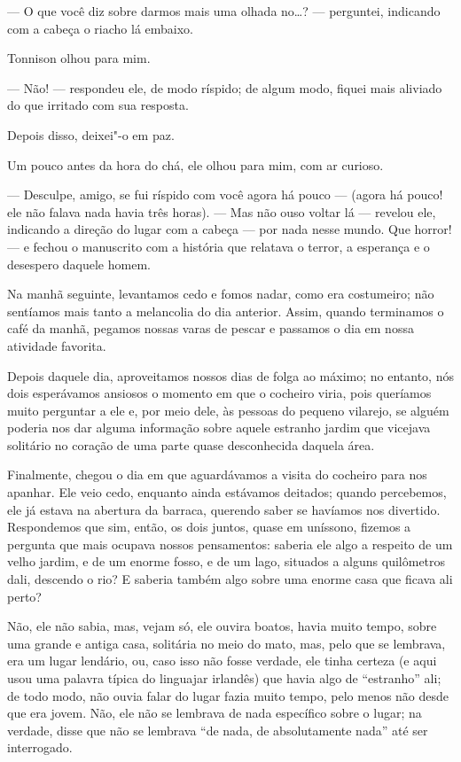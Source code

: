 --- O que você diz sobre darmos mais uma olhada no\ldots{}? --- perguntei, indicando com a cabeça o riacho lá embaixo.

Tonnison olhou para mim. 

--- Não! --- respondeu ele, de modo ríspido; de algum modo, fiquei mais
aliviado do que irritado com sua resposta.

Depois disso, deixei"-o em paz.

Um pouco antes da hora do chá, ele olhou para mim, com ar curioso.

--- Desculpe, amigo, se fui ríspido com você agora há pouco --- (agora há pouco! ele não falava nada havia três
horas). --- Mas não ouso voltar lá --- revelou ele, indicando a direção do lugar com a cabeça --- por nada nesse mundo. Que
horror! --- e fechou o manuscrito com a história que relatava o terror, a esperança e o desespero daquele homem.

Na manhã seguinte, levantamos cedo e fomos nadar, como era costumeiro; não sentíamos mais tanto a melancolia do dia
anterior. Assim, quando terminamos o café da manhã, pegamos nossas varas de pescar e passamos o dia em nossa
atividade favorita.

Depois daquele dia, aproveitamos nossos dias de folga ao máximo; no entanto, nós dois esperávamos ansiosos o momento
em que o cocheiro viria, pois queríamos muito perguntar a ele e, por meio dele, às pessoas do pequeno vilarejo, se
alguém poderia nos dar alguma informação sobre aquele estranho jardim que vicejava solitário no coração de uma parte
quase desconhecida daquela área.

Finalmente, chegou o dia em que aguardávamos a visita do cocheiro para nos apanhar. Ele veio cedo, enquanto ainda
estávamos deitados; quando percebemos, ele já estava na abertura da barraca, querendo saber se havíamos nos
divertido. Respondemos que sim, então, os dois juntos, quase em uníssono, fizemos a pergunta que mais ocupava nossos
pensamentos: saberia ele algo a respeito de um velho jardim, e de um enorme fosso, e de um lago, situados a alguns
quilômetros dali, descendo o rio? E saberia também algo sobre uma enorme casa que ficava ali perto?

Não, ele não sabia, mas, vejam só, ele ouvira boatos, havia muito tempo, sobre uma grande e antiga casa, solitária no meio
do mato, mas, pelo que se lembrava, era um lugar lendário, ou, caso isso não fosse verdade, ele tinha certeza (e aqui
usou uma palavra típica do linguajar irlandês) que havia algo de “estranho” ali; de todo modo, não ouvia falar do lugar
fazia muito tempo, pelo menos não desde que era jovem. Não, ele não se lembrava de nada específico sobre o lugar; na
verdade, disse que não se lembrava “de nada, de absolutamente nada” até ser interrogado.

